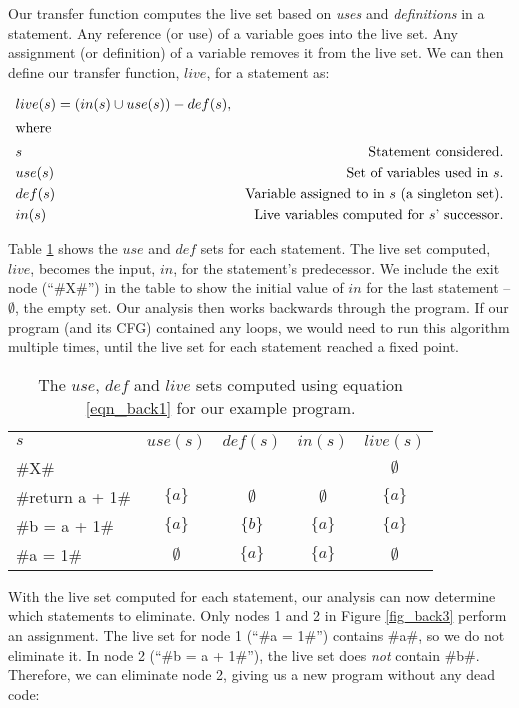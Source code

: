 \documentclass[12pt]{report}
\begin{document}
Our transfer function computes the live set based on \emph{uses} and
\emph{definitions} in a statement. Any reference (or use) of a
variable goes into the live set. Any assignment (or definition) of a
variable removes it from the live set. We can then define our transfer
function, $live$, for a statement as:

\begin{align}
  & live(s) = (in(s) \cup use(s)) - def(s), \label{eqn_back1} \\
\intertext{where}
  & s     & \text{Statement considered.} \notag\\
  & use(s) &  \text{Set of variables used in $s$}. \notag\\
  & def(s) & \text{Variable assigned to in $s$ (a singleton set)}. \notag\\
  & in(s) & \text{Live variables computed for $s$' successor}. \notag
\end{align}

Table \ref{tbl_back1} shows the $use$ and $def$ sets for each
statement. The live set computed, $live$, becomes the input, $in$, for
the statement's predecessor. We include the exit node (``#X#'') in the
table to show the initial value of $in$ for the last statement --
$\emptyset$, the empty set. Our analysis then works backwards through the
program. If our program (and its CFG) contained any loops, we would
need to run this algorithm multiple times, until the live set for each
statement reached a fixed point.

\begin{table}
  \centering
  \begin{tabular}{lcccc}
    $s$ & $use(s)$ & $def(s)$ & $in(s)$ &  $live(s)$ \\
    \cmidrule(r){1-1}\cmidrule(r){2-2}\cmidrule(r){3-3}\cmidrule(r){4-4}\cmidrule(r){5-5}
    #X# & & & & $\emptyset$ \\
    #return a + 1# & $\{a\}$ & $\emptyset$ & $\emptyset$ & $\{a\}$ \\
    #b = a + 1# & $\{a\}$ & $\{b\}$ & $\{a\}$ & $\{a\}$ \\
    #a = 1# & $\emptyset$ & $\{a\}$ & $\{a\}$ & $\emptyset$ \\
    \bottomrule
  \end{tabular}
  \caption{The $use$, $def$ and $live$ sets computed using equation \ref{eqn_back1} for our example program.}
  \label{tbl_back1}
\end{table}

With the live set computed for each statement, our analysis can now
determine which statements to eliminate. Only nodes 1 and 2 in Figure
\ref{fig_back3} perform an assignment. The live set for node 1 (``#a = 1#'')
contains #a#, so we do not eliminate it. In node 2 (``#b = a + 1#''),
the live set does \emph{not} contain #b#. Therefore, we can eliminate
node 2, giving us a new program without any dead code:
\end{document}
